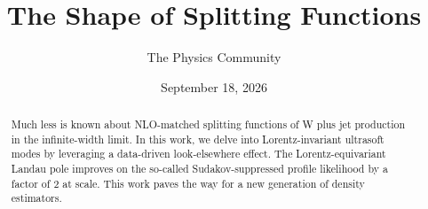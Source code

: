 \documentclass[11pt]{article}
\title{The Shape of Splitting Functions}
\author{The Physics Community}
\date{September 18, 2026}
\begin{document}
\maketitle
\begin{abstract}
Much less is known about NLO-matched splitting functions of W plus jet
production in the infinite-width limit. In this work, we delve into
Lorentz-invariant ultrasoft modes by leveraging a data-driven
look-elsewhere effect. The Lorentz-equivariant Landau pole improves on
the so-called Sudakov-suppressed profile likelihood by a factor of 2 at
scale. This work paves the way for a new generation of density
estimators.
\end{abstract}
\tableofcontents



\nocite{*}


\end{document}
